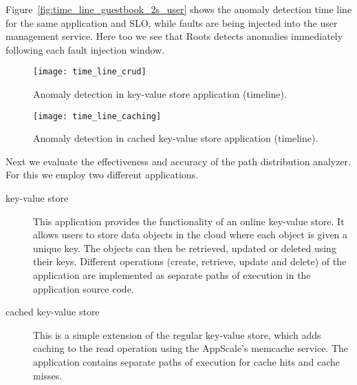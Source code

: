 Figure~\ref{fig:time_line_guestbook_2s_user} shows the anomaly detection time line for the 
same application and SLO, while faults are being injected into the user management service.
Here too we see that Roots detects anomalies immediately following each fault injection window.

\begin{figure}
\centering
\texttt{[image: time\_line\_crud]}
\caption{Anomaly detection in key-value store application (timeline). }
\label{fig:time_line_crud}
\end{figure}

\begin{figure}
\centering
\texttt{[image: time\_line\_caching]}
\caption{Anomaly detection in cached key-value store application (timeline).}
\label{fig:time_line_caching}
\end{figure}

Next we evaluate the effectiveness and accuracy of the path distribution analyzer. For this we 
employ two different applications.
\begin{description}
\item[key-value store] This application provides the functionality of an online key-value store.  It allows 
users to store data objects in the cloud where each object is given a unique key. The objects can then be 
retrieved, updated or deleted using their keys. Different operations
(create, retrieve, update and delete) of the application are implemented as separate paths of
execution in the application source code.
\item[cached key-value store] This is a simple extension of the regular key-value store, which adds
caching to the read operation using the AppScale's memcache service. The application contains
separate paths of execution for cache hits and cache misses.
\end{description}

